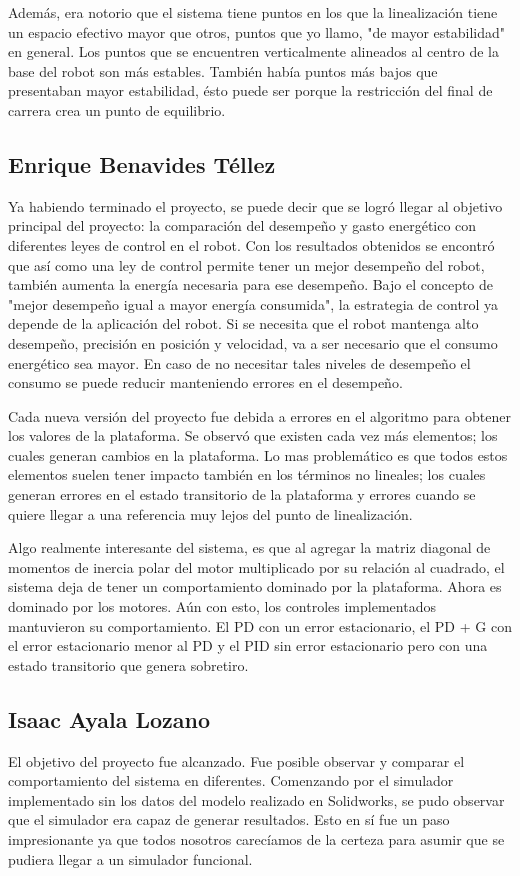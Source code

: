 Además, era notorio que el sistema tiene puntos en los que la linealización tiene un espacio efectivo mayor que otros, puntos que yo llamo, "de mayor estabilidad" en general.
Los puntos que se encuentren verticalmente alineados al centro de la base del robot son más estables.
También había puntos más bajos que presentaban mayor estabilidad, ésto puede ser porque la restricción del final de carrera crea un punto de equilibrio.


\subsection{Enrique Benavides Téllez}
Ya habiendo terminado el proyecto, se puede decir que se logró llegar al objetivo principal del proyecto: la comparación del desempeño y gasto energético con diferentes leyes de control en el robot. 
Con los resultados obtenidos se encontró que así como una ley de control permite tener un mejor desempeño del robot, también aumenta la energía necesaria para ese desempeño.
Bajo el concepto de "mejor desempeño igual a mayor energía consumida", la estrategia de control ya depende de la aplicación del robot. 
Si se necesita que el robot mantenga alto desempeño, precisión en posición y velocidad, va a ser necesario que el consumo energético sea mayor.
En caso de no necesitar tales niveles de desempeño el consumo se puede reducir manteniendo errores en el desempeño.

Cada nueva versión del proyecto fue debida a errores en el algoritmo para obtener los valores de la plataforma. 
Se observó que existen cada vez más elementos; los cuales generan cambios en la plataforma. 
Lo mas problemático es que todos estos elementos suelen tener impacto también en los términos no lineales; 
los cuales generan errores en el estado transitorio de la plataforma y errores cuando se quiere llegar a una referencia muy lejos del punto de linealización.

Algo realmente interesante del sistema, es que al agregar la matriz diagonal de momentos de inercia polar del motor multiplicado por su relación al cuadrado, el sistema deja de tener un comportamiento dominado por la plataforma. 
Ahora es dominado por los motores.
Aún con esto, los controles implementados mantuvieron su comportamiento. El PD con un error estacionario, el PD + G con el error estacionario menor al PD y el PID sin error estacionario pero con una estado transitorio que genera sobretiro.

\subsection{Isaac Ayala Lozano}
El objetivo del proyecto fue alcanzado. 
Fue posible observar y comparar el comportamiento del sistema 
en diferentes. 
Comenzando por el simulador implementado sin los datos del modelo realizado en Solidworks, se pudo observar que el simulador era capaz de generar resultados.
Esto en sí fue un paso impresionante ya que todos nosotros carecíamos de la certeza para asumir que se pudiera llegar a un simulador funcional.

